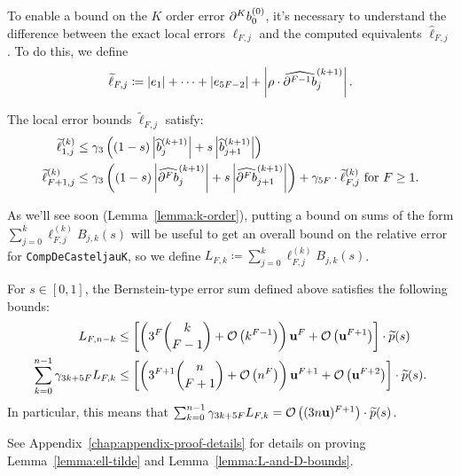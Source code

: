 To enable a bound on the \(K\) order error \(\db{K}^{(0)}_0\), it's necessary
to understand the difference between the exact local errors \(\ell_{F, j}\)
and the computed equivalents \(\widehat{\ell}_{F, j}\). To do this, we define
\begin{equation}
\widetilde{\ell}_{F, j} \coloneqq \left|e_1\right| +
\cdots + \left|e_{5F - 2}\right| + \left|\rho \cdot
\cdb{F - 1}_j^{(k + 1)}\right|.
\end{equation}

\begin{lemma}\label{lemma:ell-tilde}
The local error bounds \(\widetilde{\ell}_{F, j}\) satisfy:
\begin{align}
\widetilde{\ell}_{1, j}^{(k)} &\leq
  \gamma_3 \left(
  (1 - s) \left|\widehat{b}_j^{(k + 1)}\right| +
  s \left|\widehat{b}_{j + 1}^{(k + 1)}\right|\right)
  \label{eq:ell-tilde-1} \\
\widetilde{\ell}_{F + 1, j}^{(k)} &\leq
  \gamma_3 \left(
  (1 - s) \left|\cdb{F}_j^{(k + 1)}\right| +
  s \left|\cdb{F}_{j + 1}^{(k + 1)}\right|\right) +
  \gamma_{5F} \cdot \widetilde{\ell}_{F, j}^{(k)}
  \text{ for } F \geq 1.
\end{align}
\end{lemma}

As we'll see soon (Lemma~\ref{lemma:k-order}), putting a bound on
sums of the form \(\sum_{j = 0}^k \ell_{F, j}^{(k)} B_{j, k}(s)\) will
be useful to get an overall bound on the relative error for
\texttt{CompDeCasteljauK}, so we define
\(L_{F, k} \coloneqq \sum_{j = 0}^k \ell_{F, j}^{(k)} B_{j, k}(s)\).

\begin{lemma}\label{lemma:L-and-D-bounds}
For \(s \in \left[0, 1\right]\), the Bernstein-type error sum defined above
satisfies the following bounds:
\begin{align}
L_{F, n - k} &\leq \left[\left(3^F \binom{k}{F - 1} + \mathcal{O}\left(k^{F - 1}\right)\right)
  \mathbf{u}^F + \mathcal{O}\left(\mathbf{u}^{F + 1}\right)\right] \cdot \widetilde{p}(s) \\
\sum_{k = 0}^{n - 1} \gamma_{3k + 5F} L_{F, k} &\leq
  \left[\left(3^{F + 1} \binom{n}{F + 1} + \mathcal{O}\left(n^F\right)\right)
  \mathbf{u}^{F + 1} + \mathcal{O}\left(\mathbf{u}^{F + 2}\right)\right] \cdot \widetilde{p}(s).
  \label{eq:L-sum-bound}
\end{align}
In particular, this means that
\(\sum_{k = 0}^{n - 1} \gamma_{3k + 5F} L_{F, k} =
\mathcal{O}\left((3 n \mathbf{u})^{F + 1}\right) \cdot \widetilde{p}(s)\).
\end{lemma}

See Appendix~\ref{chap:appendix-proof-details} for details on
proving Lemma~\ref{lemma:ell-tilde} and Lemma~\ref{lemma:L-and-D-bounds}.


